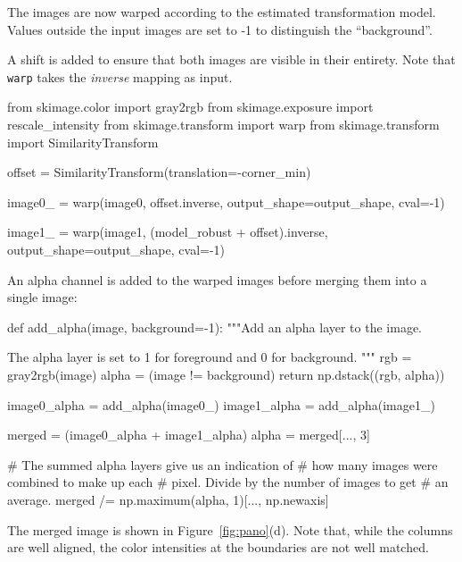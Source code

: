 \documentclass[fleqn,12pt]{wlpeerj}
\begin{document}
The images are now warped according to the estimated transformation model. Values outside the input images are set to -1 to distinguish the ``background''.

A shift is added to ensure that both images are visible in their entirety. Note that \texttt{warp} takes the \textit{inverse} mapping as input.

\begin{python}
from skimage.color import gray2rgb
from skimage.exposure import rescale_intensity
from skimage.transform import warp
from skimage.transform import SimilarityTransform

offset = SimilarityTransform(translation=-corner_min)

image0_ = warp(image0, offset.inverse,
output_shape=output_shape, cval=-1)

image1_ = warp(image1, (model_robust + offset).inverse,
output_shape=output_shape, cval=-1)
\end{python}

An alpha channel is added to the warped images before merging them into a single image:

\begin{python}
def add_alpha(image, background=-1):
"""Add an alpha layer to the image.

The alpha layer is set to 1 for foreground
and 0 for background.
"""
rgb = gray2rgb(image)
alpha = (image != background)
return np.dstack((rgb, alpha))

image0_alpha = add_alpha(image0_)
image1_alpha = add_alpha(image1_)

merged = (image0_alpha + image1_alpha)
alpha = merged[..., 3]

# The summed alpha layers give us an indication of
# how many images were combined to make up each
# pixel.  Divide by the number of images to get
# an average.
merged /= np.maximum(alpha, 1)[..., np.newaxis]
\end{python}

The merged image is shown in Figure~\ref{fig:pano}(d). Note that, while the columns are well aligned, the color intensities at the boundaries are not well matched.

\end{document}
